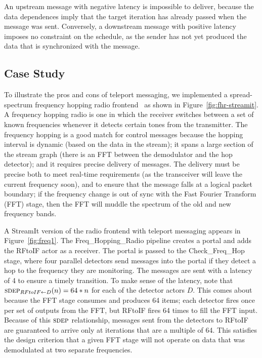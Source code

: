 An upstream message with negative latency is impossible to deliver,
because the data dependences imply that the target iteration has
already passed when the message was sent.  Conversely, a downstream
message with positive latency imposes no constraint on the schedule,
as the sender has not yet produced the data that is synchronized with
the message.

%

\subsection{Case Study}

To illustrate the pros and cons of teleport messaging, we implemented
a spread-spectrum frequency hopping radio frontend~\cite{harada02} as
shown in Figure~\ref{fig:fhr-streamit}.  A frequency hopping radio is
one in which the receiver switches between a set of known frequencies
whenever it detects certain tones from the transmitter.  The frequency
hopping is a good match for control messages because the hopping
interval is dynamic (based on the data in the stream); it spans a
large section of the stream graph (there is an FFT between the
demodulator and the hop detector); and it requires precise delivery of
messages.  The delivery must be precise both to meet real-time
requirements (as the transceiver will leave the current frequency
soon), and to ensure that the message falls at a logical packet
boundary; if the frequency change is out of sync with the Fast Fourier
Transform (FFT) stage, then the FFT will muddle the spectrum of the
old and new frequency bands.

A StreamIt version of the radio frontend with teleport messaging
appears in Figure~\ref{fig:freq1}.  The Freq\_Hopping\_Radio pipeline
creates a portal and adds the RFtoIF actor as a receiver.  The portal
is passed to the Check\_Freq\_Hop stage, where four parallel detectors
send messages into the portal if they detect a hop to the frequency
they are monitoring.  The messages are sent with a latency of 4 to
ensure a timely transition.  To make sense of the latency, note that
$\sdepf{RFtoIF}{D}(n) = 64*n$ for each of the detector actors $D$.
This comes about because the FFT stage consumes and produces 64 items;
each detector fires once per set of outputs from the FFT, but RFtoIF
fires 64 times to fill the FFT input.  Because of this $\textsc{sdep}$
relationship, messages sent from the detectors to RFtoIF are
guaranteed to arrive only at iterations that are a multiple of 64.
This satisfies the design criterion that a given FFT stage will not
operate on data that was demodulated at two separate frequencies.

